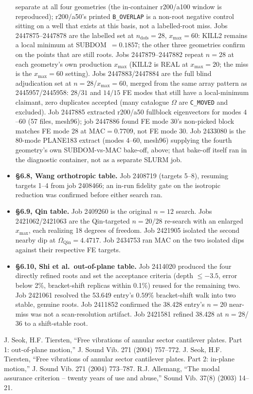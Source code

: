 \documentclass[11pt]{article}
\begin{document}
\begin{itemize}
separate at all four geometries (the in-container r200/a100 window is
reproduced); r200/a50's printed \texttt{B\_OVERLAP} is a non-root
negative control sitting on a well that exists at this basis, not a
labelled-root miss. Jobs 2447875--2447878 are the labelled set at
$n_{\mathrm{dofs}}=28$, $x_{\max}=60$: KILL2 remains a local minimum at
SUBDOM~$=0.1857$; the other three geometries confirm on the points that
are still roots. Jobs 2447879--2447882 repeat $n=28$ at each geometry's
own production $x_{\max}$ (KILL2 is REAL at $x_{\max}=20$; the miss is
the $x_{\max}=60$ setting). Jobs 2447883/2447884 are the full blind
adjudication set at $n=28$/$x_{\max}=60$, merged from the same array
pattern as 2445957/2445958: $28/31$ and $14/15$ FE modes that still have
a local-minimum claimant, zero duplicates accepted (many catalogue
$\Omega$ are \texttt{C\_MOVED} and excluded). Job 2447885 extracted
r200/a50 fullblock eigenvectors for modes $4$--$60$ (57 files, mesh96);
job 2447886 found FE mode 30's non-picked block matches FE mode 28 at
$\mathrm{MAC}=0.7709$, not FE mode 30. Job 2433080 is the 80-mode
PLANE183 extract (modes $4$--$60$, mesh96) supplying the fourth
geometry's own SUBDOM-vs-MAC bake-off, above; that bake-off itself ran
in the diagnostic container, not as a separate SLURM job.
\item \textbf{\S6.8, Wang orthotropic table.} Job 2408719 (targets 5--8),
resuming targets 1--4 from job 2408466; an in-run fidelity gate on the
isotropic reduction was confirmed before either search ran.
\item \textbf{\S6.9, Qin table.} Job 2409260 is the original $n=12$
search. Jobs 2421062/2421063 are the Qin-targeted $n=20$/$28$ re-search
with an enlarged $x_{\max}$, each realizing 18 degrees of freedom.
Job 2421905 isolated the second nearby dip
at $\Omega_{\mathrm{Qin}}=4.4717$. Job 2434753 ran MAC on the two
isolated dips against their respective FE targets.
\item \textbf{\S6.10, Shi et al.\ out-of-plane table.} Job 2414020
produced the four directly refined roots and set the acceptance criteria
(depth $\le-3.5$, error below 2\%, bracket-shift replicas within 0.1\%)
reused for the remaining two. Job 2421061 resolved the 53.649 entry's
$0.59\%$ bracket-shift walk into two stable, genuine roots. Job 2411852
confirmed the 38.428 entry's $n=20$ near-miss was not a scan-resolution
artifact. Job 2421581 refined 38.428 at $n=28$/$36$ to a shift-stable
root.
\end{itemize}

\FloatBarrier
\begin{thebibliography}{9}\small
{} J. Seok, H.F. Tiersten, ``Free vibrations of annular sector
cantilever plates. Part 1: out-of-plane motion,'' J. Sound Vib. 271 (2004)
757--772.
 J. Seok, H.F. Tiersten, ``Free vibrations of annular sector
cantilever plates. Part 2: in-plane motion,'' J. Sound Vib. 271 (2004)
773--787.
 R.J. Allemang, ``The modal assurance criterion --
twenty years of use and abuse,'' Sound Vib. 37(8) (2003) 14--21.
\end{thebibliography}
\end{document}
